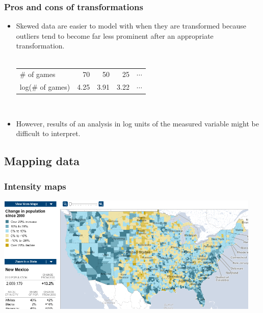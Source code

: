\begin{frame}
\frametitle{Pros and cons of transformations}

\begin{itemize}

\item Skewed data are easier to model with when they are transformed because outliers tend to become far less prominent after an appropriate transformation. \\
$\:$ \\
\renewcommand{\arraystretch}{1.5}
\begin{tabular}{l r r r r }
\# of games		&  70 	& 50 		& 25 		 		& $\cdots$ \\
log(\# of games)	& 4.25	& 3.91 	& 3.22 	 	& $\cdots$
\end{tabular}

$\:$ \\

\item However, results of an analysis in log units of the measured variable might be difficult to interpret.

\end{itemize}

\pause



\end{frame}


\subsection{Mapping data}


\begin{frame}
\frametitle{Intensity maps}


\begin{center}
\includegraphics[width=0.95\textwidth]{2-1_numerical_data/figures/change_in_pop_intensity}
\end{center}


\end{frame}


